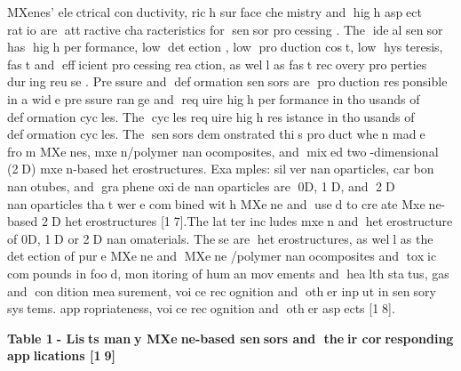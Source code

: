 {MXenes'{} electrical conductivity, rich surface
chemistry and high aspect ratio are attractive characteristics
for sensor processing . The ideal sensor has high performance,
low detection , low production cost, low hysteresis, fast and
efficient processing reaction, as well as fast recovery
properties during reuse . Pressure and deformation sensors are
production responsible in a wide pressure range and require high
performance in thousands of deformation cycles. The cycles
require high resistance in thousands of deformation cycles. The
sensors demonstrated this product when made from MXenes,
mxen/polymer nanocomposites, and mixed two-dimensional (2D)
mxen-based heterostructures. Examples: silver nanoparticles,
carbon nanotubes, and graphene oxide nanoparticles are 0D, 1D,
and 2D nanoparticles that were combined with MXene and used to
create Mxene-based 2D heterostructures {[}17{]}.The latter
includes mxen and heterostructure of 0D, 1D or 2D nanomaterials.
These are heterostructures, as well as the detection of pure
MXene and MXene /polymer nanocomposites and toxic compounds in
food, monitoring of human movements and health status, gas and
condition measurement, voice recognition and other input in
sensory systems. appropriateness, voice recognition and other
aspects {[}18{]}.

{\bfseries Table 1- Lists many MXene-based sensors and their
corresponding applications {[}19{]}}

}
